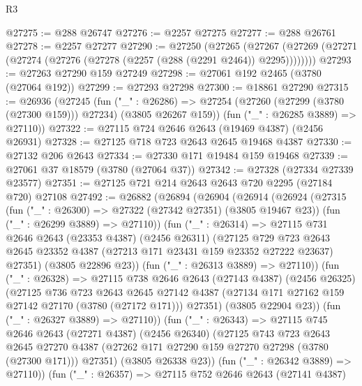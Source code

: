 \begin{lexlean}{R3}
\begin{coremodule}
@27275 := @288 @26747
@27276 := @2257 @27275
@27277 := @288 @26761
@27278 := @2257 @27277
@27290 := @27250
    (@27265
      (@27267 (@27269 (@27271 (@27274 (@27276 (@27278 (@2257 (@288 (@2291 @2464)) @2295))))))))
@27293 := @27263 @27290 @159 @27249
@27298 := @27061 @192 @2465 (@3780 (@27064 @192))
@27299 := @27293 @27298
@27300 := @18861 @27290
@27315 := @26936
    (@27245
      (fun ("_" : @26286) =>
      @27254 (@27260 (@27299 (@3780 (@27300 @159))) @27234) (@3805 @26267 @159))
      (fun ("_" : @26285 @3889) => @27110))
@27322 := @27115 @724 @2646 @2643 (@19469 @4387) (@2456 @26931)
@27328 := @27125 @718 @723 @2643 @2645 @19468 @4387
@27330 := @27132 @206 @2643
@27334 := @27330 @171 @19484 @159 @19468
@27339 := @27061 @37 @18579 (@3780 (@27064 @37))
@27342 := @27328 (@27334 @27339 @23577)
@27351 := @27125 @721 @214 @2643 @2643 @720 @2295 (@27184 @720) @27108
@27492 := @26882
    (@26894
      (@26904
        (@26914
          (@26924
            (@27315
              (fun ("_" : @26300) => @27322 (@27342 @27351) (@3805 @19467 @23))
              (fun ("_" : @26299 @3889) => @27110))
            (fun ("_" : @26314) =>
            @27115
              @731
              @2646
              @2643
              (@23353 @4387)
              (@2456 @26311)
              (@27125
                @729
                @723
                @2643
                @2645
                @23352
                @4387
                (@27213 @171 @23431 @159 @23352 @27222 @23637)
                @27351)
              (@3805 @22896 @23))
            (fun ("_" : @26313 @3889) => @27110))
          (fun ("_" : @26328) =>
          @27115
            @738
            @2646
            @2643
            (@27143 @4387)
            (@2456 @26325)
            (@27125
              @736
              @723
              @2643
              @2645
              @27142
              @4387
              (@27134 @171 @27162 @159 @27142 @27170 (@3780 (@27172 @171)))
              @27351)
            (@3805 @22904 @23))
          (fun ("_" : @26327 @3889) => @27110))
        (fun ("_" : @26343) =>
        @27115
          @745
          @2646
          @2643
          (@27271 @4387)
          (@2456 @26340)
          (@27125
            @743
            @723
            @2643
            @2645
            @27270
            @4387
            (@27262 @171 @27290 @159 @27270 @27298 (@3780 (@27300 @171)))
            @27351)
          (@3805 @26338 @23))
        (fun ("_" : @26342 @3889) => @27110))
      (fun ("_" : @26357) =>
      @27115
        @752
        @2646
        @2643
        (@27141 @4387)

\end{coremodule}
\end{lexlean}
